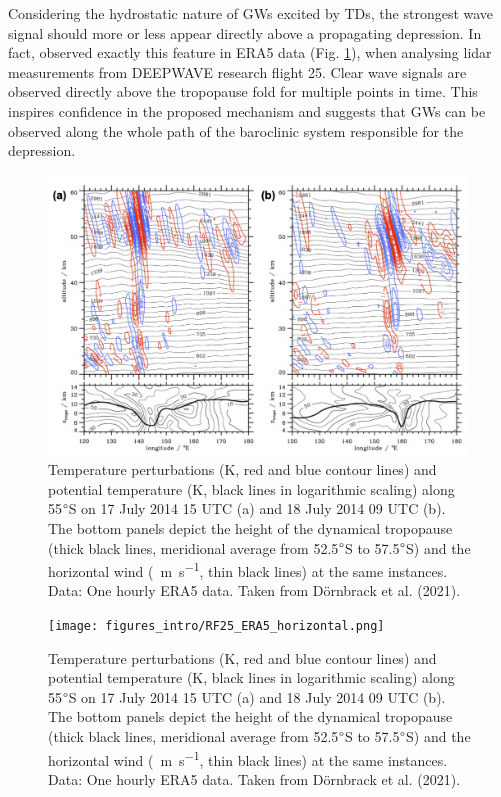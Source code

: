 Considering the hydrostatic nature of GWs excited by TDs, the strongest wave signal should more or less appear directly above a propagating depression. In fact, \textcite{dornbrack_stratospheric_2022} observed exactly this feature in ERA5 data (Fig. \ref{fig:RF25_era5_vertical}), when analysing lidar measurements from DEEPWAVE research flight 25. Clear wave signals are observed directly above the tropopause fold for multiple points in time. This inspires confidence in the proposed mechanism and suggests that GWs can be observed along the whole path of the baroclinic system responsible for the depression.
%
\begin{figure}[ht]
    \centering
    \includegraphics[width=0.99\textwidth]{figures_intro/RF25_ERA5_vertical.png}
    \caption{Temperature perturbations (K, red and blue contour lines) and potential temperature (K, black lines in logarithmic scaling) along 55$\degree$S on 17 July 2014 15 UTC (a) and 18 July 2014 09 UTC (b). The bottom panels depict the height of the dynamical tropopause (thick black lines, meridional average from 52.5$\degree$S to 57.5$\degree$S) and the horizontal wind (\SI{}{\meter\second^{-1}}, thin black lines) at the same instances. Data: One hourly ERA5 data. Taken from Dörnbrack et al. (2021).}
    \label{fig:RF25_era5_vertical}
\end{figure}
\begin{figure}[ht]
    \centering
    \texttt{[image: figures\_intro/RF25\_ERA5\_horizontal.png]}
    \caption{Temperature perturbations (K, red and blue contour lines) and potential temperature (K, black lines in logarithmic scaling) along 55$\degree$S on 17 July 2014 15 UTC (a) and 18 July 2014 09 UTC (b). The bottom panels depict the height of the dynamical tropopause (thick black lines, meridional average from 52.5$\degree$S to 57.5$\degree$S) and the horizontal wind (\SI{}{\meter\second^{-1}}, thin black lines) at the same instances. Data: One hourly ERA5 data. Taken from Dörnbrack et al. (2021).}
    \label{fig:RF25_era5_horizonal}
\end{figure}
